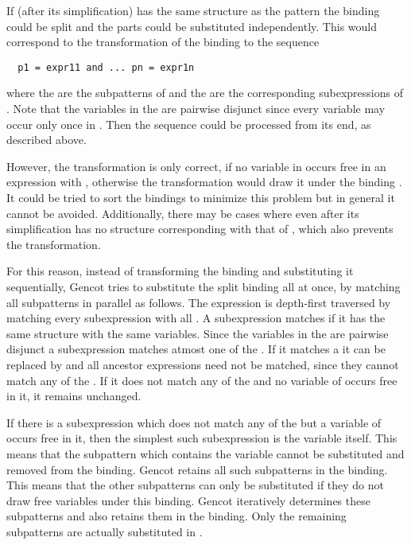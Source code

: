 If (after its simplification)  has the same structure as the pattern  the binding could be split and 
the parts could be substituted independently. This would correspond to the transformation of the binding 
to the sequence 
\begin{verbatim}
  p1 = expr11 and ... pn = expr1n
\end{verbatim}
where the  are the subpatterns of  and the  are the corresponding subexpressions of .
Note that the variables in the  are pairwise disjunct since every variable may occur only once in .
Then the sequence could be processed from its end, as described above.

However, the transformation is only correct, if no variable in  occurs free in an expression  with 
, otherwise the transformation would draw it under the binding . It could be tried to sort
the bindings to minimize this problem but in general it cannot be avoided. Additionally, there may be cases where 
even after its simplification has no structure corresponding with that of , which also prevents the transformation.

For this reason, instead of transforming the binding and substituting it sequentially, Gencot tries to substitute the split 
binding all at once, by matching all subpatterns  in parallel as follows. 
The expression  is depth-first traversed by matching every subexpression with all .
A subexpression matches  if it has the same structure with the same variables. Since the variables in the 
are pairwise disjunct a subexpression matches atmost one of the . If it matches a  it can be 
replaced by  and all ancestor expressions need not be matched, since they cannot match any of the .
If it does not match any of the  and no variable of  occurs free in it, it remains unchanged. 

If there is a subexpression which does not match any of the  but a variable of  occurs free in it, then 
the simplest such subexpression is the variable itself. This means that the subpattern  which contains the variable 
cannot be substituted and removed from the binding. Gencot retains all such subpatterns in the binding. This means that 
the other subpatterns can only be substituted if they do not draw free variables under this binding. Gencot iteratively 
determines these subpatterns and also retains them in the binding. Only the remaining subpatterns are actually substituted in 
.

